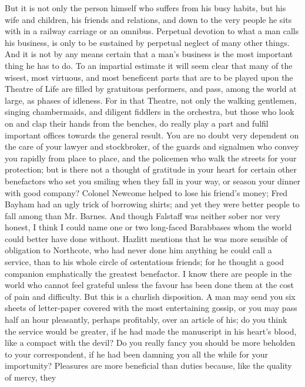 But it is not only the person himself who suffers from his
busy habits, but his wife and children, his friends and relations, and
down to the very people he sits with in a railway carriage or an
omnibus. Perpetual devotion to what a man calls his business, is only
to be sustained by perpetual neglect of many other things. And it is
not by any means certain that a man's business is the most important
thing he has to do. To an impartial estimate it will seem clear that
many of the wisest, most virtuous, and most beneficent parts that are
to be played upon the Theatre of Life are filled by gratuitous
performers, and pass, among the world at large, as phases of idleness.
For in that Theatre, not only the walking gentlemen, singing
chambermaids, and diligent fiddlers in the orchestra, but those who
look on and clap their hands from the benches, do really play a part
and fulfil important offices towards the general result. You are no
doubt very dependent on the care of your lawyer and stockbroker, of
the guards and  signalmen who convey you rapidly from place
to place, and the policemen who walk the streets for your protection;
but is there not a thought of gratitude in your heart for certain
other benefactors who set you smiling when they fall in your way, or
season your dinner with good company? Colonel Newcome helped to lose
his friend's money; Fred Bayham had an ugly trick of borrowing shirts;
and yet they were better people to fall among than Mr. Barnes. And
though Falstaff was neither sober nor very honest, I think I could
name one or two long-faced Barabbases whom the world could better have
done without. Hazlitt mentions that he was more sensible of obligation
to Northcote, who had never done him anything he could call a service,
than to his whole circle of ostentatious friends; for he thought a
good companion emphatically the greatest benefactor. I know there are
people in the world who cannot feel grateful unless the favour has
been done them at the cost of pain and difficulty. But this is a
churlish  disposition. A man may send you six sheets of
letter-paper covered with the most entertaining gossip, or you may
pass half an hour pleasantly, perhaps profitably, over an article of
his; do you think the service would be greater, if he had made the
manuscript in his heart's blood, like a compact with the devil? Do you
really fancy you should be more beholden to your correspondent, if he
had been damning you all the while for your importunity? Pleasures are
more beneficial than duties because, like the quality of mercy, they
